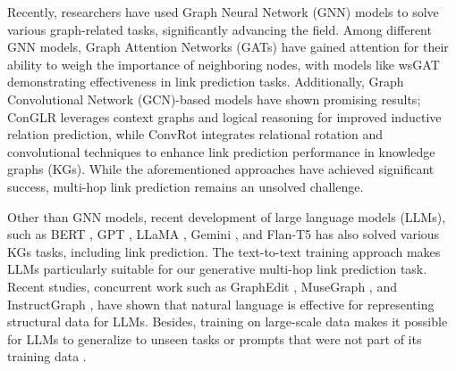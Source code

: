 \documentclass[pmlr]{jmlr}%
\begin{document}
Recently, researchers have used Graph Neural Network (GNN) models to solve various graph-related tasks, significantly advancing the field. Among different GNN models, Graph Attention Networks (GATs) have gained attention for their ability to weigh the importance of neighboring nodes, with models like wsGAT \citep{grassia2022wsgat} demonstrating effectiveness in link prediction tasks. Additionally, Graph Convolutional Network (GCN)-based models have shown promising results; ConGLR \citep{lin2022incorporating} leverages context graphs and logical reasoning for improved inductive relation prediction, while ConvRot \citep{le2023knowledge} integrates relational rotation and convolutional techniques to enhance link prediction performance in knowledge graphs (KGs). While the aforementioned approaches have achieved significant success, multi-hop link prediction remains an unsolved challenge.

Other than GNN models, recent development of large language models (LLMs), such as BERT \citep{BERT}, GPT \citep{gpt4}, LLaMA \citep{touvron2023llama}, Gemini \citep{team2023gemini}, and Flan-T5 \citep{wei2021finetuned} has also solved various KGs tasks, including link prediction. The text-to-text training approach makes LLMs particularly suitable for our generative multi-hop link prediction task. Recent studies, concurrent work such as GraphEdit \citep{guo2024graphedit}, MuseGraph \citep{tan2024musegraph}, and InstructGraph \citep{wang2024instructgraph}, have shown that natural language is effective for representing structural data for LLMs. Besides, training on large-scale data makes it possible for LLMs to generalize to unseen tasks or prompts that were not part of its training data \citep{wei2022emergent}. 
\end{document}
